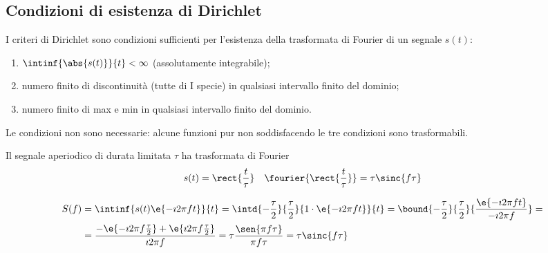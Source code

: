 \subsection{Condizioni di esistenza di Dirichlet}
I criteri di Dirichlet sono condizioni sufficienti per l'esistenza della trasformata di Fourier di un segnale $s(t)$:
\begin{enumerate}
	\item $\intinf{\abs{s(t)}}{t}<\infty$ (assolutamente integrabile);
	\item numero finito di discontinuità (tutte di I specie) in qualsiasi intervallo finito del dominio;
	\item numero finito di max e min in qualsiasi intervallo finito del dominio.
\end{enumerate}
\begin{nota}
	Le condizioni non sono necessarie: alcune funzioni pur non soddisfacendo le tre condizioni sono trasformabili.
\end{nota}
\begin{esempio}
Il segnale aperiodico di durata limitata $\tau$ ha trasformata di Fourier
\[
	s(t)=\rect{\frac{t}{\tau}}\quad\fourier{\rect{\frac{t}{\tau}}}=\tau\sinc{f\tau}
\]

\begin{figure}[ht]
	\centering
	\qquad
\end{figure}

\begin{align*}
	S(f)&=\intinf{s(t)\e{-\imath 2\pi f t}}{t}
		 =\intd{-\frac{\tau}{2}}{\frac{\tau}{2}}{1\cdot\e{-\imath 2\pi f t}}{t}
		 =\bound{-\frac{\tau}{2}}{\frac{\tau}{2}}{\frac{\e{-\imath 2\pi f t}}{-\imath 2\pi f}}=\\
		&=\frac{-\e{-\imath 2\pi f\frac{\tau}{2}}+\e{\imath 2\pi f\frac{\tau}{2}}}{\imath 2\pi f}
		 =\tau\frac{\sen{\pi f\tau}}{\pi f\tau}
		 =\tau\sinc{f\tau}
\end{align*}
\end{esempio}

